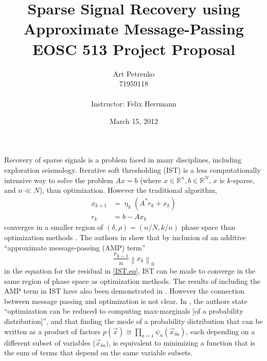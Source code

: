 \documentclass[12pt]{article}
\DeclareMathOperator{\thresh}{\eta}
\begin{document}
\providecommand{\norm}[1]{ \left \lVert #1 \right \rVert}
\providecommand{\abs}[1]{ \left \lvert #1 \right \rvert } 
\providecommand{\conj}[1]{ \overline{#1} }
\providecommand{\C}[0]{\mathbb{C}}
\providecommand{\R}[0]{\mathbb{R}}
\providecommand{\st}[0]{\left | \right.}
\providecommand{\iff}[0]{\Leftrightarrow}
\providecommand{\implies}[0]{\Rightarrow}
\providecommand{\deriv}[3]{\text{d}^{#3} #1 / \text{d} #2^{#3}}
\providecommand{\Deriv}[3]{\frac{\text{d}^{#3} #1}{\text{d} #2^{#3}}}
\providecommand{\Partial}[3]{\frac{\partial^{#3} #1}{\partial #2^{#3}}}

\title{Sparse Signal Recovery using Approximate Message-Passing\\
EOSC 513 Project Proposal}
\author{Art Petrenko\\
71959118\\
\\
Instructor: Felix Herrmann}
\date{March 15, 2012}
\maketitle

Recovery of sparse signals is a problem faced in many disciplines, including exploration seismology. Iterative soft thresholding (IST) is a less computationally intensive way to solve the problem $Ax = b$ (where $x \in \R^n, b \in \R^N$, $x$ is $k$-sparse, and $n \ll N$), than optimization. However the traditional algorithm,
\begin{equation}
\begin{split}
x_{k+1} &= \thresh_k (A^*r_k + x_k) \\
r_k &= b - Ax_k
\label{IST.eq}
\end{split}
\end{equation}
converges in a smaller region of $(\delta,\rho) = (n/N, k/n)$ phase space than optimization methods \cite{Donoho2009}. The authors in \cite{Donoho2009} show that by inclusion of an additive ``approximate message-passing (AMP) term''
\begin{equation*}
\frac{r_{k-1}}{n}\norm{x_k}_0
\end{equation*}
in the equation for the residual in \ref{IST.eq}, IST can be made to converge in the same region of phase space as optimization methods. The results of including the AMP term in IST have also been demonstrated in \cite{herrmann2012EAGEpmr}. However the connection between message passing and optimization is not clear. In \cite{Montanari2009}, the authors state ``optimization can be reduced to computing max-marginals [of a probability distribution]'', and that finding the mode of a probability distribution that can be written as a product of factors $p(\vec{x}) \cong \prod_{a=1} \psi_a(\vec{x}_{\delta a})$, each depending on a different subset of variables ($\vec{x}_{\delta a})$, is equivalent to minimizing a function that is the sum of terms that depend on the same variable subsets.
\end{document}

